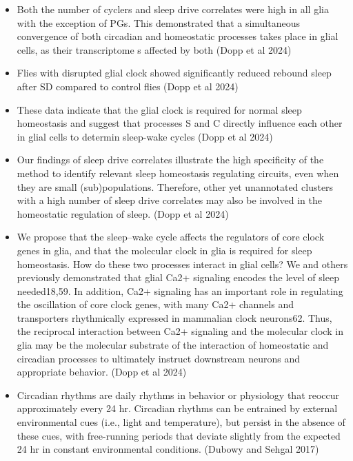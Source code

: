 \documentclass[11pt]{article}
\begin{document}
\begin{itemize}
    \item Both the number of cyclers and sleep drive correlates were high in all glia with the exception of PGs. This
    demonstrated that a simultaneous convergence of both circadian and homeostatic processes takes place in glial cells,
    as their transcriptome s affected by both
    (Dopp et al 2024)

    \item Flies with disrupted glial clock showed significantly reduced rebound sleep after SD compared to control flies
    (Dopp et al 2024)

    \item These data indicate that the glial clock is required for normal sleep homeostasis and suggest that processes S and C
    directly influence each other in glial cells to determin sleep-wake cycles
    (Dopp et al 2024)

    \item Our findings of sleep drive correlates illustrate the high specificity of the method to identify relevant sleep
    homeostasis regulating circuits, even when they are small (sub)populations. Therefore, other yet unannotated clusters
    with a high number of sleep drive correlates may also be involved in the homeostatic regulation of sleep.
    (Dopp et al 2024)

    \item We propose that the sleep–wake cycle affects the regulators of core clock genes in glia, and that the
    molecular clock in glia is required for sleep homeostasis. How do these two processes interact in glial cells?
    We and others previously demonstrated that glial Ca2+ signaling encodes the level of sleep needed18,59.
    In addition, Ca2+ signaling has an important role in regulating the oscillation of core clock genes, with
    many Ca2+ channels and transporters rhythmically expressed in mammalian clock neurons62. Thus, the reciprocal
    interaction between Ca2+ signaling and the molecular clock in glia may be the molecular substrate of the
    interaction of homeostatic and circadian processes to ultimately instruct downstream neurons and appropriate
    behavior.
    (Dopp et al 2024)

    \item Circadian rhythms are daily rhythms in behavior or physiology that reoccur approximately
    every 24 hr. Circadian rhythms can be entrained by external environmental cues (i.e., light and
    temperature), but persist in the absence of these cues, with free-running periods that deviate
    slightly from the expected 24 hr in constant environmental conditions.
    \cite{dubowyCircadianRhythmsSleep2017} (Dubowy and Sehgal 2017)


\end{itemize}
\end{document}
